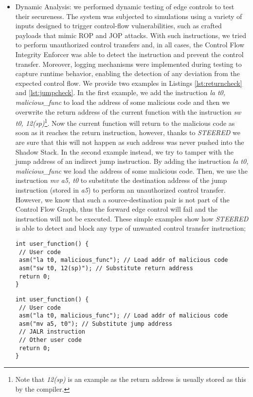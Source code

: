 \begin{itemize}
  \item Dynamic Analysis: we performed dynamic testing of edge controls to test
    their secureness. The system was subjected to simulations using a variety of
    inputs designed to trigger control-flow vulnerabilities, such as crafted
    payloads that mimic ROP and JOP attacks. With such instructions, we tried to
    perform unauthorized control transfers and, in all cases, the Control Flow
    Integrity Enforcer was able to detect the instruction and prevent the
    control transfer. Moreover, logging mechanisms were implemented during
    testing to capture runtime behavior, enabling the detection of any deviation
    from the expected control flow. We provide two examples in Listings
    \ref{lst:returncheck} and \ref{lst:jumpcheck}. In the first example, we add
    the instruction \textit{la t0, malicious\_func} to load the address of some malicious
    code and then we overwrite the return address of the current function with the
    instruction \textit{sw t0, 12(sp)}\footnote{Note that \textit{12(sp)} is an example
    as the return address is usually stored as this by the compiler.}. Now the
    current function will return to the malicious code as soon as it reaches the
    return instruction, however, thanks to \textit{STEERED} we are sure that this
    will not happen as such address was never pushed into the Shadow Stack. In
    the second example instead, we try to tamper with the jump address of an indirect
    jump instruction. By adding the instruction \textit{la t0, malicious\_func} we
    load the address of some malicious code. Then, we use the instruction \textit{mv
    a5, t0} to substitute the destination address of the jump instruction (stored
    in \textit{a5}) to perform an unauthorized control transfer. However, we know
    that such a source-destination pair is not part of the Control Flow Graph,
    thus the forward edge control will fail and the instruction will not be
    executed. These simple examples show how \textit{STEERED} is able to detect
    and block any type of unwanted control transfer instruction;

    \begin{lstlisting}[style=CStyle, caption = Return address tampering snippet, label={lst:returncheck}]
int user_function() {
 // User code
 asm("la t0, malicious_func"); // Load addr of malicious code
 asm("sw t0, 12(sp)"); // Substitute return address
 return 0;
}
 \end{lstlisting}

    \begin{lstlisting}[style=CStyle, caption = Jump address tampering snippet, label={lst:jumpcheck}]
int user_function() {
 // User code
 asm("la t0, malicious_func"); // Load addr of malicious code
 asm("mv a5, t0"); // Substitute jump address
 // JALR instruction
 // Other user code
 return 0;
}
 \end{lstlisting}


\end{itemize}
